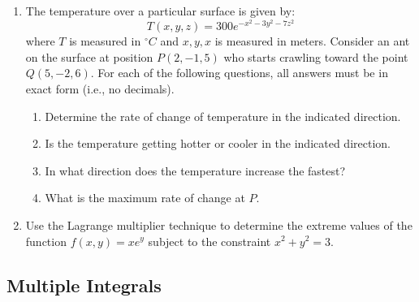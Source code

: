 \documentclass[letterpaper,12pt,fleqn]{article}
\begin{document}
\begin{enumerate}
\item The temperature over a particular surface is given by:
  \[T(x,y,z)=300e^{-x^2-3y^2-7z^2}\]
  where \(T\) is measured in \(^{\circ}C\) and \(x,y,x\) is measured in meters.  Consider an ant on the surface at
  position \(P(2,-1,5)\) who starts crawling toward the point \(Q(5,-2,6)\).  For each of the following questions,
  all answers must be in exact form (i.e., no decimals).
  \begin{enumerate}
  \item Determine the rate of change of temperature in the indicated direction.
  \item Is the temperature getting hotter or cooler in the indicated direction.
  \item In what direction does the temperature increase the fastest?
  \item What is the maximum rate of change at \(P\).
  \end{enumerate}

\item Use the Lagrange multiplier technique to determine the extreme values of the function \(f(x,y)=xe^y\) subject
  to the constraint \(x^2+y^2=3\).
\end{enumerate}

\subsection*{Multiple Integrals}
\end{document}
